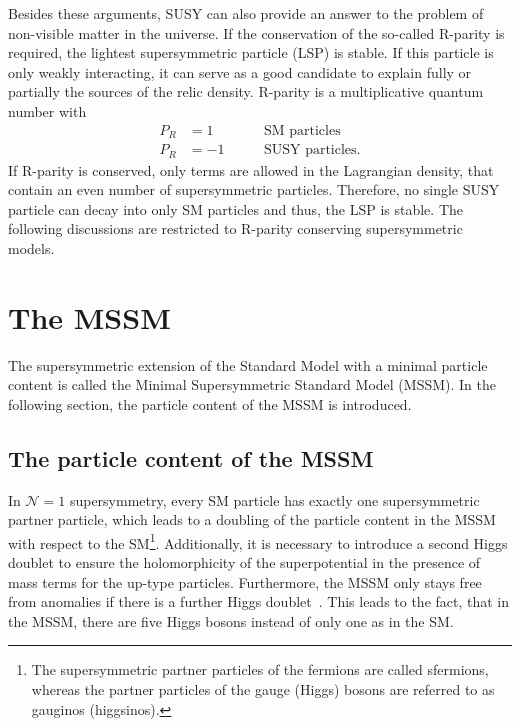Besides these arguments, SUSY can also provide an answer to the problem of non-visible matter in the universe.
If the conservation of the so-called R-parity is required, the lightest supersymmetric particle (LSP) is stable.
If this particle is only weakly interacting, it can serve as a good candidate to explain fully or partially the sources of the relic density. 
R-parity is a multiplicative quantum number with 
\begin{equation}
\begin{aligned}
P_R & =  1 \qquad &&\text{SM particles}\\
P_R & = -1 &&\text{SUSY particles}.
\end{aligned}
\end{equation}
If R-parity is conserved, only terms are allowed in the Lagrangian density, that contain an even number of supersymmetric particles.
Therefore, no single SUSY particle can decay into only SM particles and thus, the LSP is stable.
The following discussions are restricted to R-parity conserving supersymmetric models.



\section{The MSSM}
\label{sec:MSSM}
The supersymmetric extension of the Standard Model with a minimal particle content is called the Minimal Supersymmetric Standard Model (MSSM).
In the following section, the particle content of the MSSM is introduced.

\subsection{The particle content of the MSSM}
In $\mathcal{N}=1$ supersymmetry, every SM particle has exactly one supersymmetric partner particle, which leads to a doubling of the particle content in the MSSM with respect to the SM\footnote{The supersymmetric partner particles of the fermions are called sfermions, whereas the partner particles of the gauge (Higgs) bosons are referred to as gauginos (higgsinos).}.
Additionally, it is necessary to introduce a second Higgs doublet to ensure the holomorphicity of the superpotential in the presence of mass terms for the up-type particles.
Furthermore, the MSSM only stays free from anomalies if there is a further Higgs doublet~\cite{bib:SUSYPrimer}.
This leads to the fact, that in the MSSM, there are five Higgs bosons instead of only one as in the SM.

